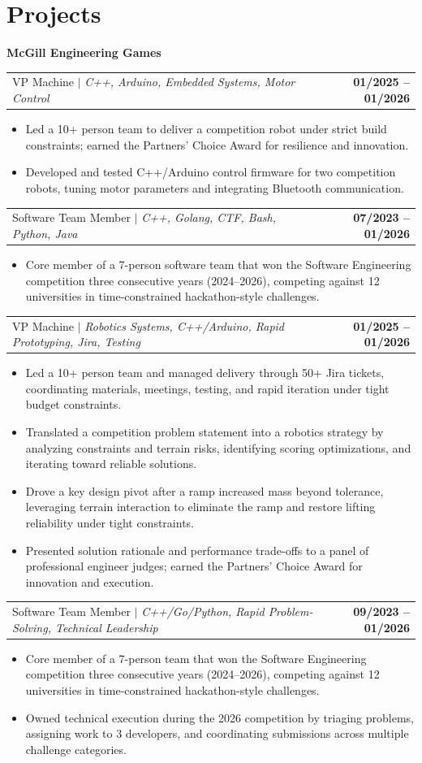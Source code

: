 \documentclass[letterpaper,11pt]{article}
\makeatletter
\newcommand{\resumeItemListStart}{%
  \begin{itemize}[topsep=2pt,itemsep=1pt,parsep=0pt,partopsep=0pt]
}
\newcommand{\resumeItemListEnd}{\end{itemize}\vspace{-8pt}}
\newcommand{\resumeItem}[1]{
  \item\small{{#1 \vspace{-2pt}}}
}
\newcommand{\resumeOrgHeading}[1]{
  \vspace{15pt} \item \textbf{#1}\vspace{-10pt}
}
\newcommand{\resumeProjectHeading}[2]{
    \item
    \begin{tabular*}{1.001\textwidth}{l@{\extracolsep{\fill}}r}
      \small#1 & \textbf{\small #2}\\
    \end{tabular*}
}
\makeatother
\begin{document}
\section{Projects}

\resumeOrgHeading{McGill Engineering Games}

\resumeProjectHeading
    {VP Machine $|$ \emph{C++, Arduino, Embedded Systems, Motor Control}}
    {01/2025 -- 01/2026}
\resumeItemListStart
  \resumeItem{Led a 10+ person team to deliver a competition robot under strict build constraints; earned the Partners’ Choice Award for resilience and innovation.}
  \resumeItem{Developed and tested C++/Arduino control firmware for two competition robots, tuning motor parameters and integrating Bluetooth communication.}
\resumeItemListEnd

\resumeProjectHeading
  {Software Team Member $|$ \emph{C++, Golang, CTF, Bash, Python, Java}}
  {07/2023 -- 01/2026}
\resumeItemListStart
  \resumeItem{Core member of a 7-person software team that won the Software Engineering competition three consecutive years (2024--2026), competing against 12 universities in time-constrained hackathon-style challenges.}
\resumeItemListEnd

\resumeProjectHeading
    {VP Machine $|$ \emph{Robotics Systems, C++/Arduino, Rapid Prototyping, Jira, Testing}}
    {01/2025 -- 01/2026}
\resumeItemListStart
    \resumeItem{Led a 10+ person team and managed delivery through 50+ Jira tickets, coordinating materials, meetings, testing, and rapid iteration under tight budget constraints.}
    \resumeItem{Translated a competition problem statement into a robotics strategy by analyzing constraints and terrain risks, identifying scoring optimizations, and iterating toward reliable solutions.}
    \resumeItem{Drove a key design pivot after a ramp increased mass beyond tolerance, leveraging terrain interaction to eliminate the ramp and restore lifting reliability under tight constraints.}
    \resumeItem{Presented solution rationale and performance trade-offs to a panel of professional engineer judges; earned the Partners' Choice Award for innovation and execution.}
\resumeItemListEnd

\resumeProjectHeading
  {Software Team Member $|$ \emph{C++/Go/Python, Rapid Problem-Solving, Technical Leadership}}
  {09/2023 -- 01/2026}
\resumeItemListStart
  \resumeItem{Core member of a 7-person team that won the Software Engineering competition three consecutive years (2024--2026), competing against 12 universities in time-constrained hackathon-style challenges.}
  \resumeItem{Owned technical execution during the 2026 competition by triaging problems, assigning work to 3 developers, and coordinating submissions across multiple challenge categories.}
\resumeItemListEnd
\end{document}
